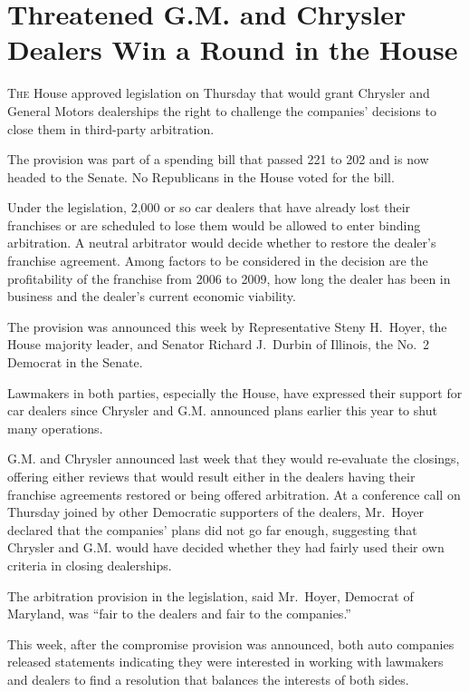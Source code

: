 ﻿\documentclass[12pt]{article}
\begin{document}
\section{Threatened G.M. and Chrysler Dealers Win a Round in the House}

\lettrine{T}{he} House approved legislation on Thursday that would grant
Chrysler and General Motors dealerships the right to challenge the companies' decisions to close
them in third-party arbitration\cite{arbitration}.

The provision was part of a spending bill that passed 221 to 202 and is now headed to the Senate. No
Republicans in the House voted for the bill.

Under the legislation, 2,000 or so car dealers that have already lost their franchises or are
scheduled to lose them would be allowed to enter binding arbitration. A neutral arbitrator would
decide whether to restore the dealer's franchise agreement. Among factors to be considered in the
decision are the profitability of the franchise from 2006 to 2009, how long the dealer has been in
business and the dealer's current economic viability.

The provision was announced this week by Representative Steny H.~Hoyer, the House majority leader,
and Senator Richard J.~Durbin of Illinois, the No.~2 Democrat in the Senate.

Lawmakers in both parties, especially the House, have expressed their support for car dealers since
Chrysler and G.M. announced plans earlier this year to shut many operations.

G.M. and Chrysler announced last week that they would re-evaluate the closings, offering either
reviews that would result either in the dealers having their franchise agreements restored or being
offered arbitration. At a conference call on Thursday joined by other Democratic supporters of the
dealers, Mr.~Hoyer declared that the companies' plans did not go far enough, suggesting that
Chrysler and G.M. would have decided whether they had fairly used their own criteria in closing
dealerships.

The arbitration provision in the legislation, said Mr.~Hoyer, Democrat of Maryland, was ``fair to
the dealers and fair to the companies.''

This week, after the compromise provision was announced, both auto companies released statements
indicating they were interested in working with lawmakers and dealers to find a resolution that
balances the interests of both sides.
\end{document}
